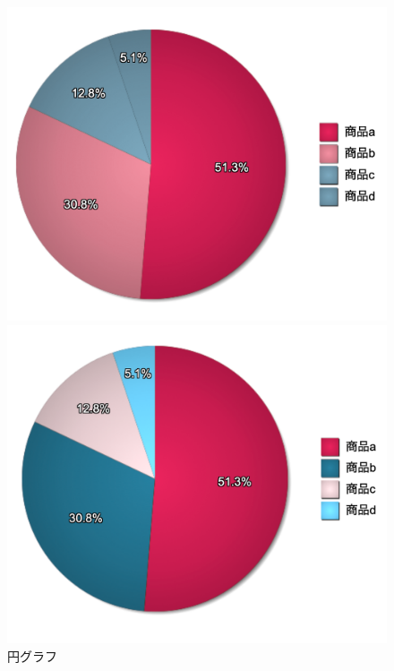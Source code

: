 \begin{figure}[H]
\begin{minipage}[b]{.49\columnwidth}
    \end{minipage}
    \begin{minipage}[b]{.49\columnwidth}
        \centering
        \includegraphics[keepaspectratio,width=\textwidth]{../../10_UniversalDesign/no2_circle_CC_T.png}
    \end{minipage}
    \begin{minipage}[b]{.49\columnwidth}
        \centering
        \includegraphics[keepaspectratio,width=\textwidth]{../../10_UniversalDesign/no2_circle_RC_T.png}
    \end{minipage}
    \caption{円グラフ}
\end{figure}